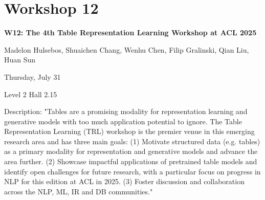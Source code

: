 \clearpage



\section[W12: The 4th Table Representation Learning Workshop at ACL 2025]{Workshop 12}
\label{workshop_12}

\begin{center}
    {\Large \textbf{W12: The 4th Table Representation Learning Workshop at ACL 2025}}

   Madelon Hulsebos, Shuaichen Chang, Wenhu Chen, Filip Gralinski, Qian Liu, Huan Sun

    Thursday, July 31
    
   Level 2 Hall 2.15

\end{center}

Description: "Tables are a promising modality for representation learning and generative models with too much application potential to ignore. The Table Representation Learning (TRL) workshop is the premier venue in this emerging research area and has three main goals:
(1) Motivate structured data (e.g. tables) as a primary modality for representation and generative models and advance the area further.
(2) Showcase impactful applications of pretrained table models and identify open challenges for future research, with a particular focus on progress in NLP for this edition at ACL in 2025.
(3) Foster discussion and collaboration across the NLP, ML, IR and DB communities."


